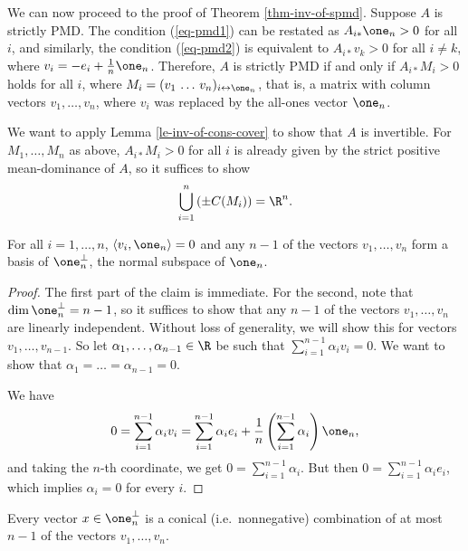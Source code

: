 \documentclass[11pt]{article}
\begin{document}
We can now proceed to the proof of Theorem \ref{thm-inv-of-spmd}. Suppose $A$ is strictly PMD. The condition (\ref{eq-pmd1}) can be restated as $A_{i*}\one_n>0$ for all $i$, and similarly, the condition (\ref{eq-pmd2}) is equivalent to $A_{i*}v_k>0$ for all $i\neq k$, where $v_i=-e_i+\frac{1}{n}\one_n$. Therefore, $A$ is strictly PMD if and only if $A_{i*}M_i>0$ holds for all $i$, where $M_i=(v_1\,\dots\,v_n)_{i\leftrightarrow \one_n}$, that is, a matrix with column vectors $v_1,\dots,v_n$, where $v_i$ was replaced by the all-ones vector $\one_n$.

We want to apply Lemma \ref{le-inv-of-cons-cover} to show that $A$ is invertible. For $M_1,\dots,M_n$ as above, $A_{i*}M_i>0$ for all $i$ is already given by the strict positive mean-dominance of $A$, so it suffices to show 
$$\bigcup_{i=1}^n\left(\pm C(M_i)\right)=\R^n.$$

\begin{claim}\label{cl-vi-independent}
    For all $i=1,\dots,n$, $\langle v_i,\one_n\rangle=0$ and any $n-1$ of the vectors $v_1,\dots,v_n$ form a basis of $\one_n^{\perp}$, the normal subspace of $\one_n$.
\end{claim}

\begin{proof}
    The first part of the claim is immediate. For the second, note that $\dim\one_n^{\perp}=n-1$, so it suffices to show that any $n-1$ of the vectors $v_1,\dots,v_n$ are linearly independent. Without loss of generality, we will show this for vectors $v_1,\dots,v_{n-1}$. So let $\alpha_1,\dots,\alpha_{n-1}\in\R$ be such that $\sum_{i=1}^{n-1} \alpha_i v_i=0$. We want to show that $\alpha_1=\dots=\alpha_{n-1}=0$.

    We have
    $$0=\sum_{i=1}^{n-1}\alpha_i v_i=\sum_{i=1}^{n-1}\alpha_ie_i+\frac{1}{n}\left(\sum_{i=1}^{n-1}\alpha_i\right)\one_n,$$
    and taking the $n$-th coordinate, we get $0=\sum_{i=1}^{n-1}\alpha_i$. But then $0=\sum_{i=1}^{n-1}\alpha_ie_i$, which implies $\alpha_i=0$ for every $i$.
\end{proof}

\begin{claim}
    \label{cl-vi-pos-combb}
    Every vector $x\in\one_n^{\perp}$ is a conical (i.e.\ nonnegative) combination of at most $n-1$ of the vectors $v_1,\dots,v_n$.
\end{claim}
\end{document}
